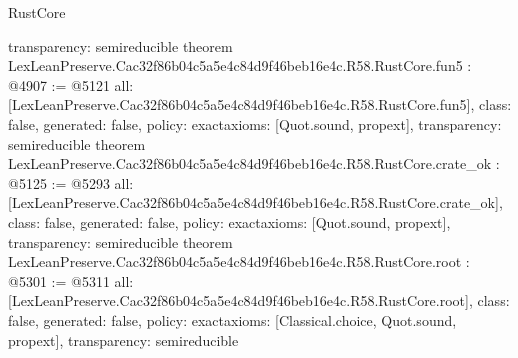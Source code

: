 \begin{lexlean}{RustCore}
\begin{coremodule}
{  transparency: semireducible
}
theorem LexLeanPreserve.Cac32f86b04c5a5e4c84d9f46beb16e4c.R58.RustCore.fun5 : @4907 := @5121 {
  all: [LexLeanPreserve.Cac32f86b04c5a5e4c84d9f46beb16e4c.R58.RustCore.fun5],
  class: false,
  generated: false,
  policy: exact{axioms: [Quot.sound, propext]},
  transparency: semireducible
}
theorem LexLeanPreserve.Cac32f86b04c5a5e4c84d9f46beb16e4c.R58.RustCore.crate_ok : @5125 := @5293 {
  all: [LexLeanPreserve.Cac32f86b04c5a5e4c84d9f46beb16e4c.R58.RustCore.crate_ok],
  class: false,
  generated: false,
  policy: exact{axioms: [Quot.sound, propext]},
  transparency: semireducible
}
theorem LexLeanPreserve.Cac32f86b04c5a5e4c84d9f46beb16e4c.R58.RustCore.root : @5301 := @5311 {
  all: [LexLeanPreserve.Cac32f86b04c5a5e4c84d9f46beb16e4c.R58.RustCore.root],
  class: false,
  generated: false,
  policy: exact{axioms: [Classical.choice, Quot.sound, propext]},
  transparency: semireducible
}


\end{coremodule}
\end{lexlean}
